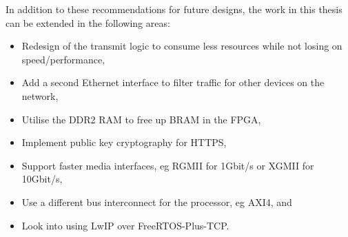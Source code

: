 In addition to these recommendations for future designs, the work in this thesis can be extended in the following areas:

\begin{itemize}
    \item Redesign of the transmit logic to consume less resources while not losing on speed/performance, 
    \item Add a second Ethernet interface to filter traffic for other devices on the network, 
    \item Utilise the DDR2 RAM to free up BRAM in the FPGA, 
    \item Implement public key cryptography for HTTPS,
    \item Support faster media interfaces, eg RGMII for 1Gbit/s or XGMII for 10Gbit/s,
    \item Use a different bus interconnect for the processor, eg AXI4, and
    \item Look into using LwIP over FreeRTOS-Plus-TCP.
\end{itemize}




